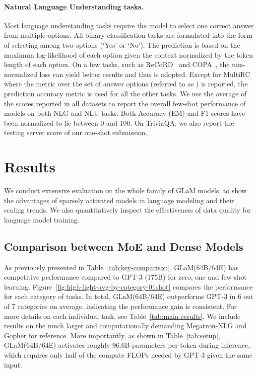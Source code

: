 \documentclass{article}
\newcommand{\glam}{GLaM\xspace}
\begin{document}
\paragraph{Natural Language Understanding tasks.} Most language understanding tasks require the model to select one correct answer from multiple options. All binary classification tasks are formulated into the form of selecting among two options (`Yes' or `No'). The prediction is based on the maximum log-likelihood of each option given the context  normalized by the token length of each option. On a few tasks, such as ReCoRD~\cite{record2018} and COPA~\cite{COPA2012}, the non-normalized loss can yield better results and thus is adopted. Except for MultiRC~\cite{multirc2018} where the  metric over the set of answer options (referred to as ) is reported, the prediction accuracy metric is used for all the other tasks.
We use the average of the scores reported in all datasets to report the overall few-shot performance of models on both NLG and NLU tasks.  Both Accuracy (EM) and F1 scores have been normalized to lie between 0 and 100. On TriviaQA, we also report the testing server score of our one-shot submission. 

\section{Results}

We conduct extensive evaluation on the whole family of \glam models, to show the advantages of sparsely activated models in language modeling and their scaling trends. We also quantitatively inspect the effectiveness of data quality for language model training.

\subsection{Comparison between MoE and Dense Models}\label{sec:moe_vs_dense}
As previously presented in Table~\ref{tab:key-comparison}, \glam (64B/64E) has competitive performance compared to GPT-3 (175B) for zero, one and few-shot learning. Figure~\ref{fig:high-light-avg-by-category-01shot} compares the performance for each category of tasks. In total, \glam (64B/64E) outperforms GPT-3 in 6 out of 7 categories on average, indicating the performance gain is consistent. For more details on each individual task, see Table~\ref{tab:main-results}. We include results on the much larger and computationally demanding Megatron-NLG and Gopher for reference.
More importantly, as shown in Table~\ref{tab:setup}, \glam (64B/64E) activates roughly 96.6B parameters per token during inference, which requires only half of the compute FLOPs needed by GPT-3 given the same input.
\end{document}
